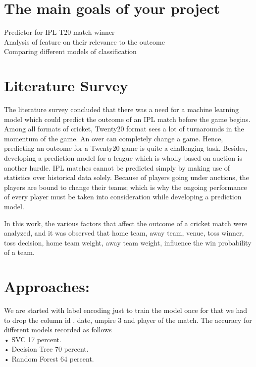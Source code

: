 \documentclass[12pt, a4paper]{article}
\begin{document}
\titlpage
\tableofcontents
\newpage


\section{\textbf{The main goals of your project}}
	Predictor for IPL T20 match winner\\
	Analysis of feature on their relevance to the outcome \\
	Comparing different models of classification\\

\newpage
\section{\textbf{Literature Survey}}
 The literature survey concluded that there was a need for a machine learning model which could predict the outcome of an IPL match before the game begins. Among all formats of cricket, Twenty20 format sees a lot of turnarounds in the momentum of the game. An over can completely change a game. Hence, predicting an outcome for a Twenty20 game is quite a challenging task. Besides, developing a prediction model for a league which is wholly based on auction is another hurdle. IPL matches cannot be predicted simply by making use of statistics over historical data solely. Because of players going under auctions, the players are bound to change their teams; which is why the ongoing performance of every player must be taken into consideration while developing a prediction model.

In this work, the various factors that aﬀect the outcome of a cricket match were
analyzed, and it was observed that home team, away team, venue, toss winner, toss decision, home team weight, away team weight, inﬂuence the win probability of a team.

 
 \section{\textbf{Approaches:}}
 We are started with label encoding just to train the model once for that we had to drop the column id , date, umpire 3 and player of the match. The accuracy for different models recorded as follows \\
•	SVC 17 percent. \\
•	Decision Tree 70 percent.\\
•	Random Forest 64 percent.\\
\end{document}
